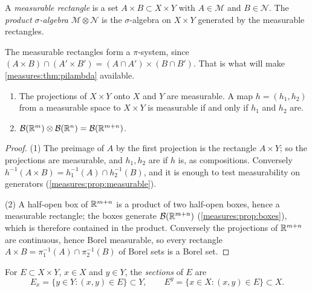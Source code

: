 \begin{notechapter}
\begin{definition}\label{fubini:def:product}
A \emph{measurable rectangle} is a set $A\times B\subset X\times Y$ with
$A\in\mathcal M$ and $B\in\mathcal N$. The \emph{product
$\sigma$-algebra} $\mathcal M\otimes\mathcal N$ is the $\sigma$-algebra
on $X\times Y$ generated by the measurable rectangles.
\end{definition}

The measurable rectangles form a $\pi$-system, since
$(A\times B)\cap(A'\times B') = (A\cap A')\times(B\cap B')$. That is
what will make \cref{measures:thm:pilambda} available.

\begin{proposition}\label{fubini:prop:components}
\begin{enumerate}[nosep]
  \item The projections of $X\times Y$ onto $X$ and $Y$ are measurable.
        A map $h = (h_1, h_2)$ from a measurable space to $X\times Y$ is
        measurable if and only if $h_1$ and $h_2$ are.
  \item $\mathcal B(\mathbb{R}^m)\otimes\mathcal B(\mathbb{R}^n) = \mathcal B(\mathbb{R}^{m+n})$.
\end{enumerate}
\end{proposition}

\begin{proof}
(1) The preimage of $A$ by the first projection is the rectangle
$A\times Y$; so the projections are measurable, and $h_1, h_2$ are if
$h$ is, as compositions. Conversely
$h^{-1}(A\times B) = h_1^{-1}(A)\cap h_2^{-1}(B)$, and it is enough to
test measurability on generators (\cref{measures:prop:measurable}).

(2) A half-open box of $\mathbb{R}^{m+n}$ is a product of two half-open boxes,
hence a measurable rectangle; the boxes generate
$\mathcal B(\mathbb{R}^{m+n})$ (\cref{measures:prop:boxes}), which is therefore
contained in the product. Conversely the projections of $\mathbb{R}^{m+n}$ are
continuous, hence Borel measurable, so every rectangle
$A\times B = \pi_1^{-1}(A)\cap\pi_2^{-1}(B)$ of Borel sets is a Borel set.
\end{proof}

\begin{definition}[Sections]\label{fubini:def:sections}
For $E\subset X\times Y$, $x\in X$ and $y\in Y$, the \emph{sections} of
$E$ are
\[
  E_x = \{y\in Y : (x, y)\in E\}\subset Y , \qquad
  E^y = \{x\in X : (x, y)\in E\}\subset X .
\]
\end{definition}


\end{notechapter}
